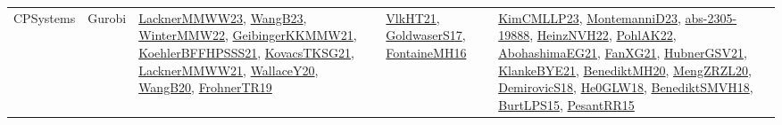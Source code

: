 {\begin{longtable}{lp{3cm}>{\raggedright}p{6cm}>{\raggedright}p{6cm}p{8cm}}
CPSystems & Gurobi & \href{articles/LacknerMMWW23.pdf}{LacknerMMWW23}\cite{LacknerMMWW23}, \href{papers/WangB23.pdf}{WangB23}\cite{WangB23}, \href{papers/WinterMMW22.pdf}{WinterMMW22}\cite{WinterMMW22}, \href{papers/GeibingerKKMMW21.pdf}{GeibingerKKMMW21}\cite{GeibingerKKMMW21}, \href{articles/KoehlerBFFHPSSS21.pdf}{KoehlerBFFHPSSS21}\cite{KoehlerBFFHPSSS21}, \href{papers/KovacsTKSG21.pdf}{KovacsTKSG21}\cite{KovacsTKSG21}, \href{papers/LacknerMMWW21.pdf}{LacknerMMWW21}\cite{LacknerMMWW21}, \href{articles/WallaceY20.pdf}{WallaceY20}\cite{WallaceY20}, \href{papers/WangB20.pdf}{WangB20}\cite{WangB20}, \href{papers/FrohnerTR19.pdf}{FrohnerTR19}\cite{FrohnerTR19} & \href{articles/VlkHT21.pdf}{VlkHT21}\cite{VlkHT21}, \href{papers/GoldwaserS17.pdf}{GoldwaserS17}\cite{GoldwaserS17}, \href{papers/FontaineMH16.pdf}{FontaineMH16}\cite{FontaineMH16} & \href{papers/KimCMLLP23.pdf}{KimCMLLP23}\cite{KimCMLLP23}, \href{articles/MontemanniD23.pdf}{MontemanniD23}\cite{MontemanniD23}, \href{articles/abs-2305-19888.pdf}{abs-2305-19888}\cite{abs-2305-19888}, \href{articles/HeinzNVH22.pdf}{HeinzNVH22}\cite{HeinzNVH22}, \href{articles/PohlAK22.pdf}{PohlAK22}\cite{PohlAK22}, \href{articles/AbohashimaEG21.pdf}{AbohashimaEG21}\cite{AbohashimaEG21}, \href{articles/FanXG21.pdf}{FanXG21}\cite{FanXG21}, \href{articles/HubnerGSV21.pdf}{HubnerGSV21}\cite{HubnerGSV21}, \href{papers/KlankeBYE21.pdf}{KlankeBYE21}\cite{KlankeBYE21}, \href{articles/BenediktMH20.pdf}{BenediktMH20}\cite{BenediktMH20}, \href{articles/MengZRZL20.pdf}{MengZRZL20}\cite{MengZRZL20}, \href{papers/DemirovicS18.pdf}{DemirovicS18}\cite{DemirovicS18}, \href{papers/He0GLW18.pdf}{He0GLW18}\cite{He0GLW18}, \href{papers/BenediktSMVH18.pdf}{BenediktSMVH18}\cite{BenediktSMVH18}, \href{papers/BurtLPS15.pdf}{BurtLPS15}\cite{BurtLPS15}, \href{papers/PesantRR15.pdf}{PesantRR15}\cite{PesantRR15}\\

\end{longtable}}
